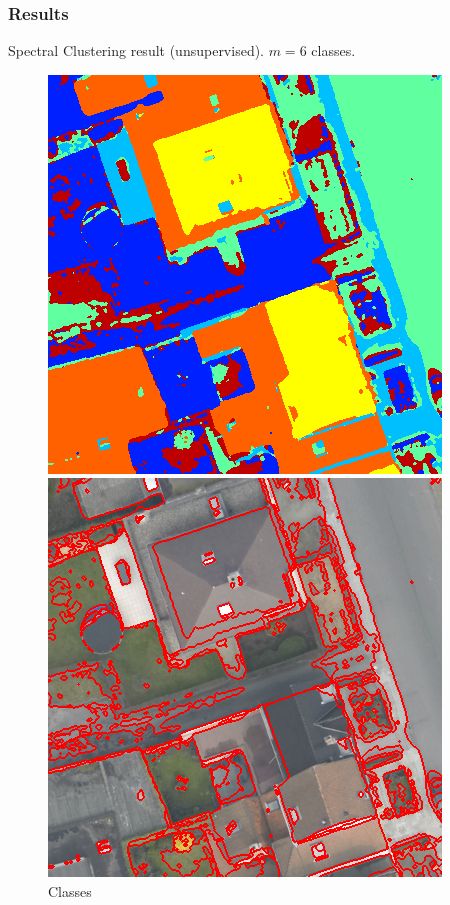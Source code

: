 \documentclass{beamer}
\begin{document}

\begin{frame}
  \frametitle{Results}
  Spectral Clustering result (unsupervised). $m = 6$ classes.
  \begin{figure}[ht]
    \begin{minipage}[b]{0.45\linewidth}
      \centering
      \includegraphics[width=\textwidth]{./Images/DFC2015/K.png}
      \caption{Classes}
    \end{minipage}
    \begin{minipage}[b]{0.45\linewidth}
      \centering
      \includegraphics[width=\textwidth]{./Images/DFC2015/segmentation.png}

\end{minipage}
\end{figure}
\end{frame}
\end{document}
